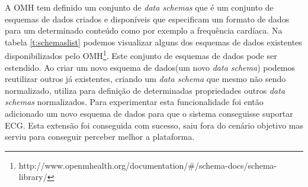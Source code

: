 A \gls{OMH} tem definido um conjunto de \textit{data schemas} \cite{omhschemas} que é um conjunto de esquemas de dados criados e disponíveis que especificam um formato de dados para um determinado conteúdo como por exemplo a frequência cardíaca\cite{omhschemas}. Na tabela \ref{t:schemaslist} podemos visualizar alguns dos esquemas de dados existentes disponibilizados pelo \gls{OMH}\footnote{http://www.openmhealth.org/documentation/\#/schema-docs/schema-library/}. Este conjunto de esquemas de dados pode ser estendido. Ao criar um novo esquema de dados(um novo \textit{data schema}) podemos reutilizar outros já existentes, criando um \textit{data schema} que mesmo não sendo normalizado, utiliza para definição de determinadas propriedades outros \textit{data schemas} normalizados. Para experimentar esta funcionalidade foi então adicionado um novo esquema de dados para que o sistema conseguisse suportar \gls{ECG}. Esta extensão foi conseguida com sucesso, saiu fora do cenário objetivo mas serviu para conseguir perceber melhor a plataforma. \par 
\newpage


